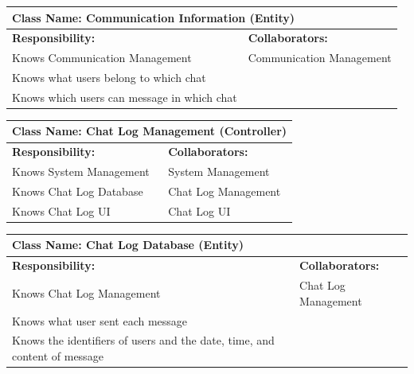 \documentclass[]{article}
\begin{document}
\begin{table}[ht]
	\centering
	\begin{tabular}{|p{7cm}|p{7cm}|}
		\hline
		\multicolumn{2}{|l|}{\textbf{Class Name:} Communication Information (Entity)} \\
		\hline
		\textbf{Responsibility:}                    & \textbf{Collaborators:}         \\
		\hline
		Knows Communication Management              & Communication Management        \\
		Knows what users belong to which chat       &                                 \\
		Knows which users can message in which chat &                                 \\
		\hline
	\end{tabular}
\end{table}

\begin{table}[ht]
	\centering
	\begin{tabular}{|p{7cm}|p{7cm}|}
		\hline
		\multicolumn{2}{|l|}{\textbf{Class Name:} Chat Log Management (Controller)} \\
		\hline
		\textbf{Responsibility:} & \textbf{Collaborators:}                          \\
		\hline
		Knows System Management  & System Management                                \\
		Knows Chat Log Database  & Chat Log Management                              \\
		Knows Chat Log UI        & Chat Log UI                                      \\
		\hline
	\end{tabular}
\end{table}

\begin{table}[ht]
	\centering
	\begin{tabular}{|p{7cm}|p{7cm}|}
		\hline
		\multicolumn{2}{|l|}{\textbf{Class Name:} Chat Log Database (Entity)}                               \\
		\hline
		\textbf{Responsibility:}                                                  & \textbf{Collaborators:} \\
		\hline
		Knows Chat Log Management                                                 & Chat Log Management     \\
		Knows what user sent each message                                         &                         \\
		Knows the identifiers of users and the date, time, and content of message &                         \\
		\hline
	\end{tabular}
\end{table}
\end{document}
